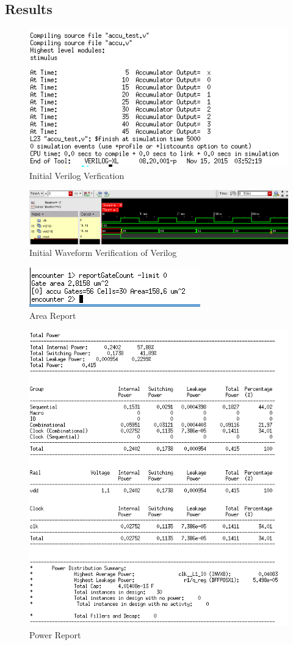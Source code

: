 \documentclass[12pt]{article}
\begin{document}
\subsection{Results}

\begin{figure}[H]
\centering
\includegraphics[width=0.5\linewidth]{verilog}
\caption{Initial Verilog Verfication}
\label{fig:verilog}
\end{figure}

\begin{figure}[H]
\centering
\includegraphics[width=1\linewidth]{waveform-intial}
\caption{Initial Waveform Verification of Verilog}
\label{fig:waveform-intial}
\end{figure}

\begin{figure}[H]
\centering
\includegraphics[width=0.5\linewidth]{area-report}
\caption{Area Report}
\label{fig:area-report}
\end{figure}

\begin{figure}[H]
\centering
\includegraphics[width=0.7\linewidth]{power-report}
\caption{Power Report}
\label{fig:power-report}
\end{figure}
\end{document}
